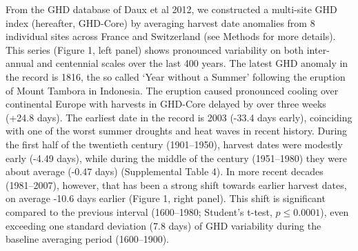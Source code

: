 \documentclass[final]{nature}
\begin{document}
\indent From the GHD database of Daux et al 2012\cite{Daux2012}, we constructed a multi-site GHD index (hereafter, GHD-Core) by averaging harvest date anomalies from 8 individual sites across France and Switzerland (see Methods for more details). This series (Figure 1, left panel) shows pronounced variability on both inter-annual and centennial scales over the last 400 years. The latest GHD anomaly in the record is 1816, the so called `Year without a Summer' following the eruption of Mount Tambora in Indonesia\cite{Oppenheimer2003}. The eruption caused pronounced cooling over continental Europe with harvests in GHD-Core delayed by over three weeks (+24.8 days). The earliest date in the record is 2003 (-33.4 days early), coinciding with one of the worst summer droughts and heat waves in recent history\cite{Rebetz2006}. During the first half of the twentieth century (1901--1950), harvest dates were modestly early (-4.49 days), while during the middle of the century (1951--1980) they were about average (-0.47 days) (Supplemental Table 4). In more recent decades (1981--2007), however, that has been a strong shift towards earlier harvest dates, on average -10.6 days earlier (Figure 1, right panel). This shift is significant compared to the previous interval (1600--1980; Student's t-test, $p\le0.0001$), even exceeding one standard deviation (7.8 days) of GHD variability during the baseline averaging period (1600--1900).\\
\end{document}
